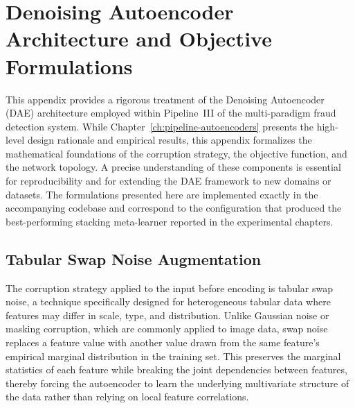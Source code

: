 \chapter{Denoising Autoencoder Architecture and Objective Formulations}
\label{app:dae-arch}

This appendix provides a rigorous treatment of the Denoising Autoencoder (DAE) architecture employed within Pipeline~III of the multi-paradigm fraud detection system. While Chapter~\ref{ch:pipeline-autoencoders} presents the high-level design rationale and empirical results, this appendix formalizes the mathematical foundations of the corruption strategy, the objective function, and the network topology. A precise understanding of these components is essential for reproducibility and for extending the DAE framework to new domains or datasets. The formulations presented here are implemented exactly in the accompanying codebase and correspond to the configuration that produced the best-performing stacking meta-learner reported in the experimental chapters.

\section{Tabular Swap Noise Augmentation}
\label{app:dae-swap-noise}

The corruption strategy applied to the input before encoding is tabular swap noise, a technique specifically designed for heterogeneous tabular data where features may differ in scale, type, and distribution. Unlike Gaussian noise or masking corruption, which are commonly applied to image data, swap noise replaces a feature value with another value drawn from the same feature's empirical marginal distribution in the training set. This preserves the marginal statistics of each feature while breaking the joint dependencies between features, thereby forcing the autoencoder to learn the underlying multivariate structure of the data rather than relying on local feature correlations.

